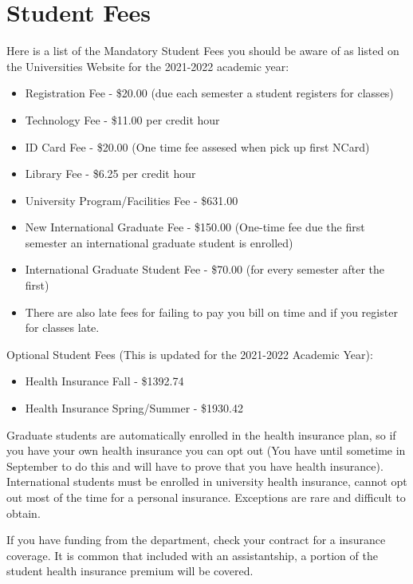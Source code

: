 \documentclass[
  12pt,
]{book}
\providecommand{\tightlist}{%
  \setlength{\itemsep}{0pt}\setlength{\parskip}{0pt}}
\begin{document}
\hypertarget{student-fees}{%
\section{Student Fees}\label{student-fees}}

Here is a list of the Mandatory Student Fees you should be aware of as listed on the Universities Website for the 2021-2022 academic year:

\begin{itemize}
\tightlist
\item
  Registration Fee - \$20.00 (due each semester a student registers for classes)
\item
  Technology Fee - \$11.00 per credit hour
\item
  ID Card Fee - \$20.00 (One time fee assesed when pick up first NCard)
\item
  Library Fee - \$6.25 per credit hour
\item
  University Program/Facilities Fee - \$631.00
\item
  New International Graduate Fee - \$150.00 (One-time fee due the first semester an international graduate student is enrolled)
\item
  International Graduate Student Fee - \$70.00 (for every semester after the first)
\item
  There are also late fees for failing to pay you bill on time and if you register for classes late.
\end{itemize}

Optional Student Fees (This is updated for the 2021-2022 Academic Year):

\begin{itemize}
\tightlist
\item
  Health Insurance Fall - \$1392.74
\item
  Health Insurance Spring/Summer - \$1930.42
\end{itemize}

Graduate students are automatically enrolled in the health insurance plan, so if you have your own health insurance you can opt out (You have until sometime in September to do this and will have to prove that you have health insurance). International students must be enrolled in university health insurance, cannot opt out most of the time for a personal insurance. Exceptions are rare and difficult to obtain.

If you have funding from the department, check your contract for a insurance coverage. It is common that included with an assistantship, a portion of the student health insurance premium will be covered.
\end{document}
